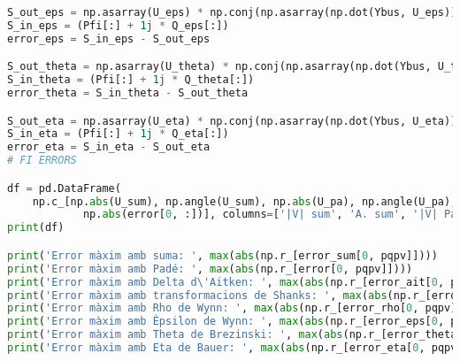 \begin{lstlisting}[language=Python,numbers=none]
S_out_eps = np.asarray(U_eps) * np.conj(np.asarray(np.dot(Ybus, U_eps)))
S_in_eps = (Pfi[:] + 1j * Q_eps[:])
error_eps = S_in_eps - S_out_eps

S_out_theta = np.asarray(U_theta) * np.conj(np.asarray(np.dot(Ybus, U_theta)))
S_in_theta = (Pfi[:] + 1j * Q_theta[:])
error_theta = S_in_theta - S_out_theta

S_out_eta = np.asarray(U_eta) * np.conj(np.asarray(np.dot(Ybus, U_eta)))
S_in_eta = (Pfi[:] + 1j * Q_eta[:])
error_eta = S_in_eta - S_out_eta
# FI ERRORS

df = pd.DataFrame(
    np.c_[np.abs(U_sum), np.angle(U_sum), np.abs(U_pa), np.angle(U_pa), np.real(Sig_re), np.real(Sig_im),
            np.abs(error[0, :])], columns=['|V| sum', 'A. sum', '|V| Padé', 'A. Padé', 'Sigma re', 'Sigma im', 'S error'])
print(df)

print('Error màxim amb suma: ', max(abs(np.r_[error_sum[0, pqpv]])))
print('Error màxim amb Padé: ', max(abs(np.r_[error[0, pqpv]])))
print('Error màxim amb Delta d\'Aitken: ', max(abs(np.r_[error_ait[0, pqpv]])))
print('Error màxim amb transformacions de Shanks: ', max(abs(np.r_[error_shanks[0, pqpv]])))
print('Error màxim amb Rho de Wynn: ', max(abs(np.r_[error_rho[0, pqpv]])))
print('Error màxim amb Èpsilon de Wynn: ', max(abs(np.r_[error_eps[0, pqpv]])))
print('Error màxim amb Theta de Brezinski: ', max(abs(np.r_[error_theta[0, pqpv]])))
print('Error màxim amb Eta de Bauer: ', max(abs(np.r_[error_eta[0, pqpv]])))

\end{lstlisting}



